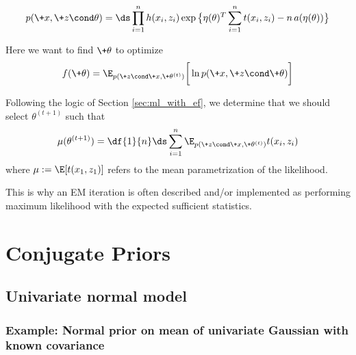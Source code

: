 \documentclass{article} %
\begin{document}
\begin{align}
\label{eqn:exponential_family_complete_data_likelihood}
 p(\+x, \+z \cond \theta) = \ds\prod_{i=1}^n h(x_i, z_i) \exp \big\{ \eta(\theta)^T \sum_{i=1}^n t(x_i, z_i) - n \,a(\eta(\theta))\big\} 
 \end{align}

Here we want to find $\+\theta$ to optimize 
\[ f(\+\theta) =  \E_{p(\+z \cond \+x , \+\theta^{(t)})} \bigg[ \ln p(\+x, \+z \cond \+\theta) \bigg] \]

Following the logic of Section \ref{sec:ml_with_ef}, we determine that we should select $\theta^{(t+1)}$ such that
\[ \mu(\theta^{(t+1)}) = \df{1}{n} \ds\sum_{i=1}^n   \E_{p(\+z \cond \+x , \+\theta^{(t)})} t(x_i, z_i) \]
where $\mu := \E[t(x_1,z_1)]$ refers to the mean parametrization of the likelihood.

This is why an EM iteration is often described and/or implemented as performing maximum likelihood with the expected sufficient statistics.


 
 \section{Conjugate Priors} \label{sec:conjugate_exponential_family_models}
 
 
 \subsection{Univariate normal model}
 
\subsubsection{Example:  Normal prior on mean of univariate Gaussian with known covariance}
\end{document}
